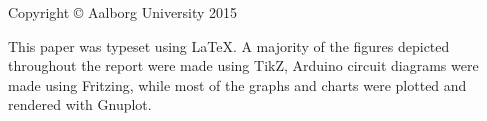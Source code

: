 \thispagestyle{empty}
{\small
\strut\vfill
\noindent Copyright \copyright{} Aalborg University 2015\par
\vspace{0.2cm}
\noindent This paper was typeset using \LaTeX. A majority of the figures depicted throughout the report were made using TikZ, Arduino circuit diagrams were made using Fritzing, while most of the graphs and charts were plotted and rendered with Gnuplot. }
\clearpage